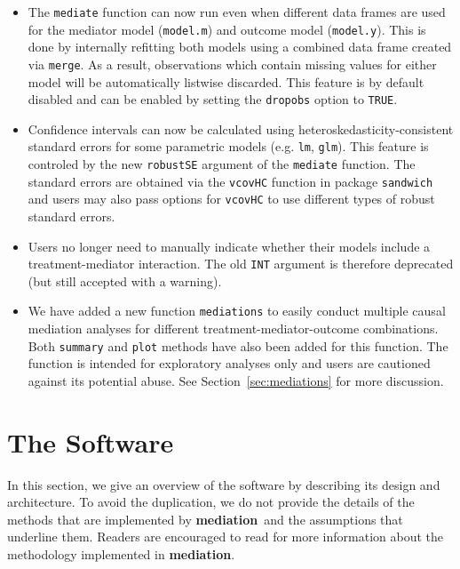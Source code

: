 \documentclass[11pt,letterpaper]{article}
\theoremstyle{plain}
\newcommand\bmediation{{\bf mediation}}
\begin{document}
\begin{itemize}
\item The {\tt mediate} function can now run even when different data frames are used
for the mediator model ({\tt model.m}) and outcome model ({\tt model.y}).  This is
done by internally refitting both models using a combined data frame created via {\tt merge}.
As a result, observations which contain missing values for either model will be
automatically listwise discarded.  This feature is by default disabled and can be
enabled by setting the {\tt dropobs} option to {\tt TRUE}.

\item Confidence intervals can now be calculated using heteroskedasticity-consistent
standard errors for some parametric models (e.g. {\tt lm}, {\tt glm}).  This
feature is controled by the new {\tt robustSE} argument of the {\tt mediate} function.
The standard errors are obtained via the {\tt vcovHC} function in package {\tt sandwich}
and users may also pass options for {\tt vcovHC} to use different types of
robust standard errors.

\item Users no longer need to manually indicate whether their models include a treatment-mediator
interaction.  The old {\tt INT} argument is therefore deprecated (but still accepted
with a warning).

\item We have added a new function {\tt mediations} to easily conduct multiple
causal mediation analyses for different treatment-mediator-outcome combinations.
Both {\tt summary} and {\tt plot} methods have also been added for this function.
The function is intended for exploratory analyses only and users are cautioned against
its potential abuse.  See Section~\ref{sec:mediations} for more discussion.

\end{itemize}

\section{The Software}

In this section, we give an overview of the software by describing its
design and architecture.  To avoid the duplication, we do not provide
the details of the methods that are implemented by \bmediation\ and
the assumptions that underline them.  Readers are encouraged to read
\citet{imai:keel:yama:10,imai:keel:ting:10} for more information about
the methodology implemented in \bmediation.
\end{document}

